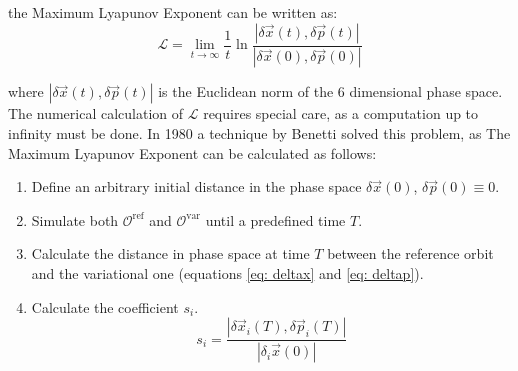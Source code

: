 	the Maximum Lyapunov Exponent can be written as:
	\begin{equation}
		\mathcal{L} = \lim_{t\rightarrow\infty}\dfrac{1}{t}\ln\dfrac{\left|\delta\vec{x}(t), \delta\vec{p}(t)\right|}{\left|\delta\vec{x}(0), \delta\vec{p}(0)\right|}
	\end{equation}
	
	where $|\delta\vec{x}(t), \delta\vec{p}(t)|$ is the Euclidean norm of the 6 dimensional phase space. The numerical calculation of $\mathcal{L}$ requires special care, as a computation up to infinity must be done. In 1980 a technique by Benetti solved this problem, as The Maximum Lyapunov Exponent can be calculated as follows:
	\begin{enumerate}
		\item Define an arbitrary initial distance in the phase space $\delta\vec{x}(0)$, $\delta\vec{p}(0) \equiv 0$.
		\item Simulate both $\mathcal{O}^\text{ref}$ and $\mathcal{O}^\text{var}$ until a predefined time $T$.
		\item Calculate the distance in phase space at time $T$ between the reference orbit and the variational one (equations \ref{eq: deltax} and \ref{eq: deltap}).
		\item Calculate the coefficient $s_i$.
		\begin{equation}
			s_i = \dfrac{\left|\delta\vec{x}_i(T), \delta\vec{p}_i(T)\right|}{\left|\delta_i\vec{x}(0)\right|}
		\end{equation}
	\end{enumerate} 
	